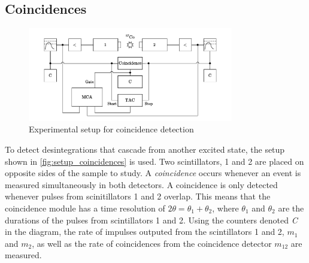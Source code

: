 \subsection{Coincidences}
\label{sec:coincidences}

\begin{figure}[h]
    \centering
    \includegraphics[width=0.8\textwidth]{figures/coincidence_schematic.pdf}
    \caption{Experimental setup for coincidence detection \cite{notice_VI}}
    \label{fig:setup_coincidences}
\end{figure}
To detect desintegrations that cascade from another excited state, the setup shown in \hbox{\autoref{fig:setup_coincidences}} is used. 
Two scintillators, 1 and 2 are placed on opposite sides of the sample to study.
A \emph{coincidence} occurs whenever an event is measured simultaneously in both detectors. A coincidence is only detected whenever pulses from scinitillators 1 and 2 overlap. This means that the coincidence module has a time resolution of \(2 \theta = \theta_1 + \theta_2\), where \(\theta_1\) and \(\theta_2\) are the durations of the pulses from scintillators 1 and 2.
Using the counters denoted \emph{C} in the diagram, the rate of impulses outputed from the scintillators 1 and 2, \(m_1\) and \(m_2\), as well as the rate of coincidences from the coincidence detector \(m_{12}\) are measured. %

